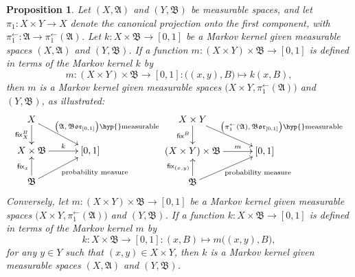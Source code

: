 \documentclass[
twoside=true,
paper=letter,
fontsize=9pt,
pagesize=auto,
leqno,
openany,
headsepline,
overfullrule,
]{scrbook}
\theoremstyle{plain}
\theoremstyle{plain}
\newtheorem{prop}[thm]{Proposition}
\theoremstyle{definition}
\theoremstyle{bfnoteitalic}
\theoremstyle{bfnoteroman}
\newcommand{\sigalg}[1]{\mathfrak{#1}}
\newcommand{\sfop}[1]{\mathsf{#1}}
\newcommand{\borel}{\mathfrak{Bor}}
\newcommand{\preimage}[1]{#1^{\leftarrow}}
\newcommand{\sigmaalgebra}{\sigalg{A}}
\newcommand{\sigmaalgebraii}{\sigalg{B}}
\newcommand{\measurespace}{X}
\newcommand{\measurespaceii}{Y}
\newcommand{\mspaceelt}{x}
\newcommand{\mspaceeltii}{y}
\newcommand{\setii}{B}
\newcommand{\projectionone}{\pi_1}
\newcommand{\markovkernel}{k}
\newcommand{\markovkernelii}{m}
\newcommand{\fixinthefirst}[1]{\sfop{fix}_{#1}}
\newcommand{\fixinthesecond}[1]{\sfop{fix}^{#1}}
\begin{document}
\begin{prop}\label{induced_markov_kernel}
Let $(\measurespace, \sigmaalgebra)$ and 
$(\measurespaceii, \sigmaalgebraii)$ be measurable spaces, 
and let 
$\projectionone: \measurespace\times\measurespaceii \to \measurespace$ denote the canonical projection onto the first component, with 
$\preimage\projectionone: 
\sigmaalgebra\to
\preimage{\projectionone}(\sigmaalgebra)$.
Let
$\markovkernel:\measurespace\times\sigmaalgebraii\to [0,1]$ 
be a Markov kernel given measurable spaces
$(\measurespace, \sigmaalgebra)$ and 
$(\measurespaceii, \sigmaalgebraii)$. If a function 
$\markovkernelii:
(\measurespace\times\measurespaceii) \times \sigmaalgebraii 
\to
[0,1]$
is defined in terms of the Markov kernel $\markovkernel$ by
\[
\markovkernelii:
(\measurespace\times\measurespaceii) \times \sigmaalgebraii 
\to
[0,1]
: 
\bigl((\mspaceelt,\mspaceeltii),\setii\bigr)\mapsto 
\markovkernel(\mspaceelt,\setii),
\]
then 
$\markovkernelii$ is a Markov kernel given measurable spaces
$\bigl(\measurespace\times\measurespaceii, \preimage\projectionone(\sigmaalgebra)\bigr)$
and
$(\measurespaceii, \sigmaalgebraii)$, as illustrated:
\[
\xymatrix@R=18pt@C=30pt{ 
\measurespace \ar[d]_-{\fixinthesecond{\setii}_\measurespace} 
\ar[dr]^{\qquad\text{ $\bigl(\sigmaalgebra, \borel_{[0,1]}\bigr)$\hyp{}measurable}}\\
\measurespace\times\sigmaalgebraii \ar[r]^-{\markovkernel} & [0,1] \\
\sigmaalgebraii 
\ar[ur]_{\qquad\text{probability measure}} \ar[u]^{\fixinthefirst{\mspaceelt}} & \\
}
%
\xymatrix@R=18pt@C=30pt{ 
\measurespace\times\measurespaceii 
\ar[d]_-{\fixinthesecond{\setii}}
\ar[dr]^{\qquad\text{\qquad$\bigl(\preimage\projectionone(\sigmaalgebra), \borel_{[0,1]}\bigr)$\hyp{}measurable}}\\
(\measurespace\times\measurespaceii)\times\sigmaalgebraii \ar[r]^-{\markovkernelii} & [0,1] \\
\sigmaalgebraii 
\ar[ur]_{\qquad\text{probability measure}} \ar[u]^{\fixinthefirst{(\mspaceelt,\mspaceeltii)}} & \\
}
\]
Conversely, let 
$\markovkernelii :(\measurespace\times\measurespaceii)
\times \sigmaalgebraii
\to [0,1]$ be a Markov kernel given measurable spaces
$\bigl(\measurespace\times\measurespaceii, \preimage\projectionone(\sigmaalgebra)\bigr)$
and
$(\measurespaceii, \sigmaalgebraii)$.
If a function 
$\markovkernel:
\measurespace\times \sigmaalgebraii 
\to
[0,1]$
is defined in terms of the Markov kernel $\markovkernelii$ by
\[
\markovkernel:
\measurespace\times \sigmaalgebraii 
\to
[0,1]
: 
(\mspaceelt,\setii)
\mapsto 
\markovkernelii\bigl((\mspaceelt,\mspaceeltii),\setii\bigr),
\]
for any $\mspaceeltii\in\measurespaceii$ such that
$(\mspaceelt, \mspaceeltii)\in\measurespace\times\measurespaceii$,
then $\markovkernel$
is a Markov kernel given measurable spaces
$(\measurespace, \sigmaalgebra)$ and 
$(\measurespaceii, \sigmaalgebraii)$.
\end{prop}
\end{document}
